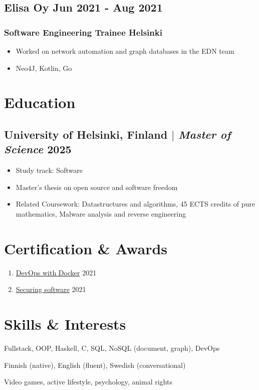 \documentclass[11pt]{article} %
\begin{document}
\subsection{Elisa Oy \hfill Jun 2021 - Aug 2021}
\subsubsection{Software Engineering Trainee \hfill Helsinki}
\begin{itemize}
	\item Worked on network automation and graph databases in the EDN team
	\item Neo4J, Kotlin, Go
\end{itemize}

\section{Education}
\subsection{University of Helsinki, Finland $|$ {\normalfont\itshape Master of Science} \hfill 2025}
\begin{itemize}
	\item Study track: Software
	\item Master's thesis on open source and software freedom
  \item Related Coursework: Datastructures and algorithms, 45 ECTS credits of pure mathematics, Malware analysis and reverse engineering
\end{itemize}

\section{Certification \& Awards}
\begin{enumerate}[label=\null, left=0pt..0pt, itemsep=0pt]
	\item \href{https://studies.cs.helsinki.fi/stats/api/certificate/docker2021/en/6432ff37598eb056cb40b1c54bf1253e}{DevOps with Docker} \hfill 2021
	\item \href{https://certificates.mooc.fi/validate/a4wa1ljd0ir}{Securing software} \hfill 2021
\end{enumerate}

\section{Skills \& Interests}
\begin{description}[itemsep=0pt]
	\item[Technical] Fullstack, OOP, Haskell, C, SQL, NoSQL (document, graph), DevOps
	\item[Language] Finnish (native), English (fluent), Swedish (conversational)
	\item[Interests] Video games, active lifestyle, psychology, animal rights
\end{description}
\end{document}
